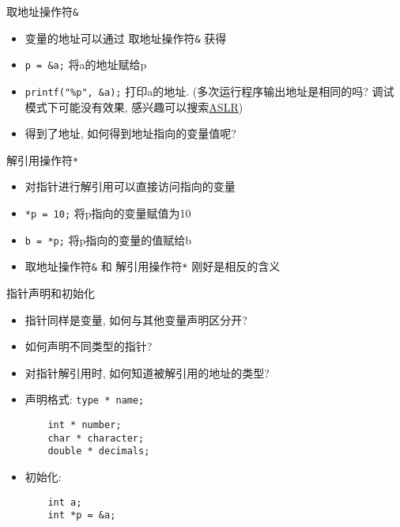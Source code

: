\begin{frame}[fragile]{取地址操作符\texttt{\&}}
    \begin{itemize}[<+- | alert@+>]
        \item 变量的地址可以通过 取地址操作符\texttt{\&} 获得
        \item \texttt{p = \&a;} 将a的地址赋给p
        \item \texttt{printf("\%p", \&a);} 打印a的地址.
        (多次运行程序输出地址是相同的吗?
        调试模式下可能没有效果, 感兴趣可以搜索\href{https://en.wikipedia.org/wiki/Address_space_layout_randomization}{ASLR})
        \item 得到了地址, 如何得到地址指向的变量值呢?
    \end{itemize}
\end{frame}

\begin{frame}[fragile]{解引用操作符\texttt{*}}
    \begin{itemize}[<+- | alert@+>]
        \item 对指针进行解引用可以直接访问指向的变量
        \item \texttt{*p = 10;} 将p指向的变量赋值为10
        \item \texttt{b = *p;} 将p指向的变量的值赋给b
        \item 取地址操作符\texttt{\&} 和 解引用操作符\texttt{*} 刚好是相反的含义
    \end{itemize}
\end{frame}

\begin{frame}[fragile]{指针声明和初始化}
    \begin{itemize}[<+- | alert@+>]
        \item 指针同样是变量, 如何与其他变量声明区分开?
        \item 如何声明不同类型的指针?
        \item 对指针解引用时, 如何知道被解引用的地址的类型?
        \item 声明格式: \texttt{type * name;}
        \begin{verbatim}
    int * number;
    char * character;
    double * decimals;
        \end{verbatim}
        \item 初始化:
        \begin{verbatim}
    int a;
    int *p = &a;
        \end{verbatim}
    \end{itemize}
\end{frame}

